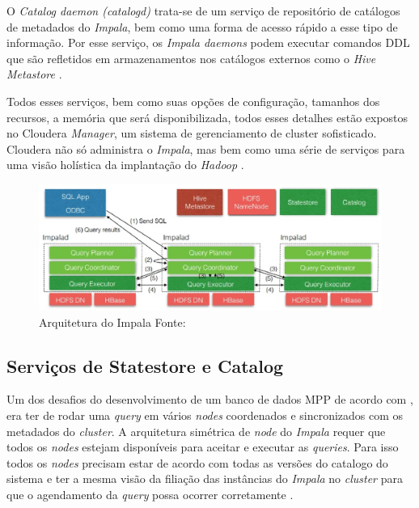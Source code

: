             O \textit{Catalog daemon (catalogd)} trata-se de um serviço de repositório de catálogos de metadados do \textit{Impala},
            bem como uma forma de acesso rápido a esse tipo de informação. Por esse serviço, os \textit{Impala daemons} podem
            executar comandos DDL que são refletidos em armazenamentos nos catálogos externos como o \textit{Hive Metastore}
            \cite{bittorf2015}.

            Todos esses serviços, bem como suas opções de configuração, tamanhos dos recursos, a memória que será disponibilizada,
            todos esses detalhes estão expostos no Cloudera \textit{Manager}, um sistema de gerenciamento de cluster sofisticado.
            Cloudera não só administra o \textit{Impala}, mas bem como uma série de serviços para uma visão holística da implantação
            do \textit{Hadoop} \cite{chauhan2013}.

             \begin{figure}[ht!]
                        \centering
                        \includegraphics[keepaspectratio=true,scale=0.7]
                            {figuras/figura17.eps}
                        \caption[Arquitetura do Impala]
                        {Arquitetura do Impala
                        \protect \linebreak Fonte: }
                        \label{figura17}
            \end{figure}

        \subsection{Serviços de Statestore e Catalog}

            Um dos desafios do desenvolvimento de um banco de dados MPP de acordo com \cite{bittorf2015}, era ter de rodar uma
            \textit{query} em vários \textit{nodes} coordenados e sincronizados com os metadados do \textit{cluster}. A arquitetura
            simétrica de \textit{node} do \textit{Impala} requer que todos os \textit{nodes} estejam disponíveis para aceitar e executar
            as \textit{queries}. Para isso todos os \textit{nodes} precisam estar de acordo com todas as versões do catalogo do sistema
            e ter a mesma visão da filiação das instâncias do \textit{Impala} no \textit{cluster} para que o agendamento da \textit{query}
            possa ocorrer corretamente \cite{bittorf2015}.

